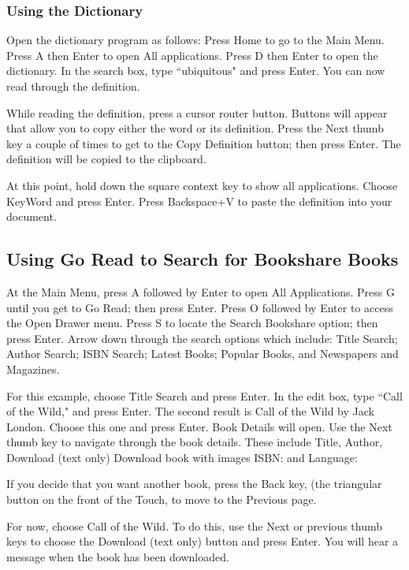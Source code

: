 \documentclass[10pt,letterpaper,twoside]{report}
\begin{document}
{{{\subsubsection{Using the Dictionary}

Open the dictionary program as follows:
Press Home to go to the Main Menu.
Press A then Enter to open All applications.
Press D then Enter to open the dictionary.
In the search box, type ``ubiquitous" and press Enter.
You can now read through the definition.

While reading the definition, press a cursor router button. Buttons will appear that allow you to copy either the word or its definition. Press the Next thumb key a couple of times to get to the Copy Definition button; then press Enter. The definition will be copied to the clipboard.

At this point, hold down the square context key to show all applications.
Choose KeyWord and press Enter.
Press Backspace+V to paste the definition into your document.

\subsection{Using Go Read to Search for Bookshare Books}

At the Main Menu, press A followed by Enter to open All Applications.
Press G until you get to Go Read; then press Enter.
Press O followed by Enter to access the Open Drawer menu.
Press S to locate the Search Bookshare option; then press Enter.
Arrow down through the search options which include:
Title Search;
Author Search;
ISBN Search;
Latest Books;
Popular Books, and
Newspapers and Magazines.

For this example, choose Title Search and press Enter.
In the edit box, type ``Call of the Wild," and press Enter.
The second result is Call of the Wild by Jack London. Choose this one and press Enter. Book Details will open.
Use the Next thumb key to navigate through the book details.
These include Title, Author, Download (text only)
Download book with images
ISBN: and
Language:
 
If you decide that you want another book, press the Back key, (the triangular button on the front of the Touch, to move to the Previous page.

For now, choose Call of the Wild. To do this, use the Next or previous thumb keys to choose the Download (text only) button and press Enter. You will hear a message when the book has been downloaded.

}}}
\end{document}

